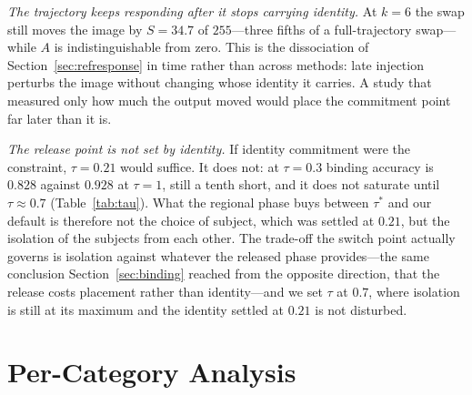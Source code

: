 \documentclass[review,10pt,times]{elsarticle}
\begin{document}
\noindent\textit{The trajectory keeps responding after it stops carrying
identity.}
At $k{=}6$ the swap still moves the image by $S{=}34.7$ of $255$---three
fifths of a full-trajectory swap---while $A$ is indistinguishable from zero.
This is the dissociation of Section~\ref{sec:refresponse} in time rather than
across methods: late injection perturbs the image without changing whose
identity it carries.  A study that measured only how much the output moved
would place the commitment point far later than it is.

\noindent\textit{The release point is not set by identity.}
If identity commitment were the constraint, $\tau{=}0.21$ would suffice.  It
does not: at $\tau{=}0.3$ binding accuracy is $0.828$ against $0.928$ at
$\tau{=}1$, still a tenth short, and it does not saturate until
$\tau{\approx}0.7$ (Table~\ref{tab:tau}).  What the regional phase buys
between $\tau^{*}$ and our default is therefore not the choice of subject,
which was settled at $0.21$, but the isolation of the subjects from each
other.  The trade-off the switch point actually governs is isolation against
whatever the released phase provides---the same conclusion
Section~\ref{sec:binding} reached from the opposite direction, that the
release costs placement rather than identity---and we set $\tau$ at $0.7$,
where isolation is still at its maximum and the identity settled at $0.21$ is
not disturbed.



\section{Per-Category Analysis}

\begin{table}[htbp]
\centering
\caption{%
  \textbf{Per-category ArcFace identity} on Mixed-Eval-v1
  (Ours at the default $\tau{=}0.7$).
  Person: portrait samples; Mixed: scene samples with faces.
  Detect rate shows fraction of regions where ArcFace detected a face.
}
\label{tab:percategory}
\end{table}
\end{document}
